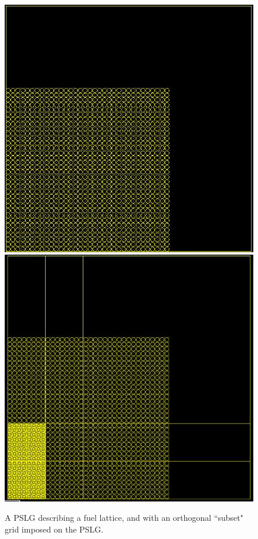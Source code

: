 \documentclass{anstrans}
\begin{document}
\begin{figure}
\centering
\includegraphics[scale = 0.5]{figures/lattice.png}
\includegraphics[scale = 0.5]{figures/subsetlattice.png}
\caption{A PSLG describing a fuel lattice, and with an orthogonal ``subset" grid imposed on the PSLG.}
\label{grid}
\end{figure}
\end{document}
